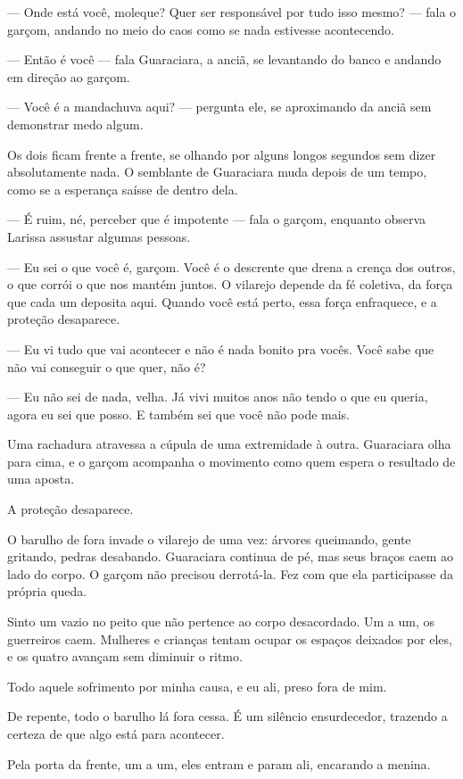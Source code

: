 — Onde está você, moleque? Quer ser responsável por tudo isso mesmo? — fala o garçom, andando no meio do caos como se nada estivesse acontecendo.

— Então é você — fala Guaraciara, a anciã, se levantando do banco e andando em direção ao garçom.

— Você é a mandachuva aqui? — pergunta ele, se aproximando da anciã sem demonstrar medo algum.

Os dois ficam frente a frente, se olhando por alguns longos segundos sem dizer absolutamente nada.
O semblante de Guaraciara muda depois de um tempo, como se a esperança saísse de dentro dela.

— É ruim, né, perceber que é impotente — fala o garçom, enquanto observa Larissa assustar algumas pessoas.

— Eu sei o que você é, garçom.  
Você é o descrente que drena a crença dos outros, o que corrói o que nos mantém juntos.  
O vilarejo depende da fé coletiva, da força que cada um deposita aqui.  
Quando você está perto, essa força enfraquece, e a proteção desaparece.

— Eu vi tudo que vai acontecer e não é nada bonito pra vocês. Você sabe que não vai conseguir o que quer, não é?

— Eu não sei de nada, velha. Já vivi muitos anos não tendo o que eu queria, agora eu sei que posso. E também sei que você não pode mais.

Uma rachadura atravessa a cúpula de uma extremidade à outra. Guaraciara olha para cima, e o garçom acompanha o movimento como quem espera o resultado de uma aposta.

A proteção desaparece.

O barulho de fora invade o vilarejo de uma vez: árvores queimando, gente gritando, pedras desabando. Guaraciara continua de pé, mas seus braços caem ao lado do corpo. O garçom não precisou derrotá-la. Fez com que ela participasse da própria queda.

Sinto um vazio no peito que não pertence ao corpo desacordado. Um a um, os guerreiros caem. Mulheres e crianças tentam ocupar os espaços deixados por eles, e os quatro avançam sem diminuir o ritmo.

Todo aquele sofrimento por minha causa, e eu ali, preso fora de mim.

De repente, todo o barulho lá fora cessa.  
É um silêncio ensurdecedor, trazendo a certeza de que algo está para acontecer.

Pela porta da frente, um a um, eles entram e param ali, encarando a menina.

